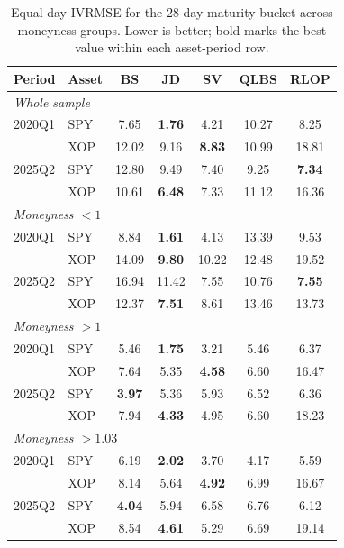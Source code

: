 \begin{table}[t]
\centering
\footnotesize
\setlength{\tabcolsep}{3.5pt}
\renewcommand{\arraystretch}{0.95}
\begin{tabular}{llccccc}
\toprule
Period & Asset & BS & JD & SV & QLBS & RLOP \\
\midrule
\multicolumn{7}{l}{\textit{Whole sample}} \\
2020Q1 & SPY & 7.65 & \textbf{1.76} & 4.21 & 10.27 & 8.25 \\
       & XOP & 12.02 & 9.16 & \textbf{8.83} & 10.99 & 18.81 \\
2025Q2 & SPY & 12.80 & 9.49 & 7.40 & 9.25 & \textbf{7.34} \\
       & XOP & 10.61 & \textbf{6.48} & 7.33 & 11.12 & 16.36 \\
\midrule
\multicolumn{7}{l}{\textit{Moneyness $<1$}} \\
2020Q1 & SPY & 8.84 & \textbf{1.61} & 4.13 & 13.39 & 9.53 \\
       & XOP & 14.09 & \textbf{9.80} & 10.22 & 12.48 & 19.52 \\
2025Q2 & SPY & 16.94 & 11.42 & 7.55 & 10.76 & \textbf{7.55} \\
       & XOP & 12.37 & \textbf{7.51} & 8.61 & 13.46 & 13.73 \\
\midrule
\multicolumn{7}{l}{\textit{Moneyness $>1$}} \\
2020Q1 & SPY & 5.46 & \textbf{1.75} & 3.21 & 5.46 & 6.37 \\
       & XOP & 7.64 & 5.35 & \textbf{4.58} & 6.60 & 16.47 \\
2025Q2 & SPY & \textbf{3.97} & 5.36 & 5.93 & 6.52 & 6.36 \\
       & XOP & 7.94 & \textbf{4.33} & 4.95 & 6.60 & 18.23 \\
\midrule
\multicolumn{7}{l}{\textit{Moneyness $>1.03$}} \\
2020Q1 & SPY & 6.19 & \textbf{2.02} & 3.70 & 4.17 & 5.59 \\
       & XOP & 8.14 & 5.64 & \textbf{4.92} & 6.99 & 16.67 \\
2025Q2 & SPY & \textbf{4.04} & 5.94 & 6.58 & 6.76 & 6.12 \\
       & XOP & 8.54 & \textbf{4.61} & 5.29 & 6.69 & 19.14 \\
\bottomrule
\end{tabular}
\caption{Equal-day IVRMSE for the 28-day maturity bucket across moneyness groups. Lower is better; bold marks the best value within each asset-period row.}
\label{tab:ivrmse_28d_by_moneyness}
\end{table}

